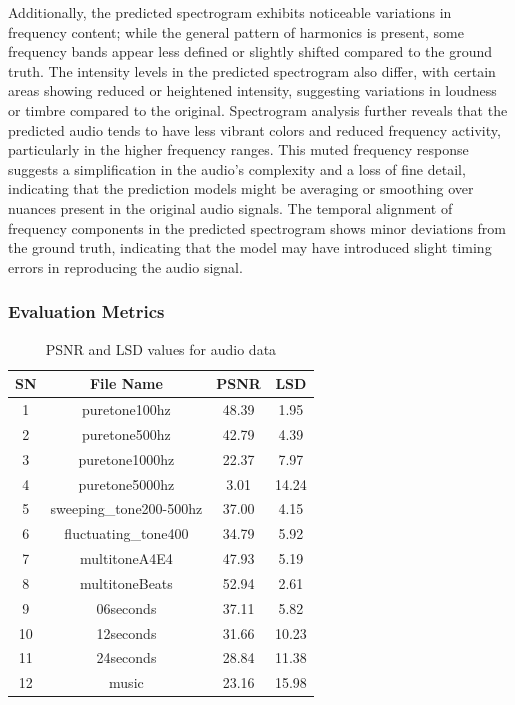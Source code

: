 \documentclass{ioereport}
\begin{document}
    Additionally, the predicted spectrogram exhibits noticeable variations in frequency content; while the general pattern of harmonics is present, some frequency bands appear less defined or slightly shifted compared to the ground truth. The intensity levels in the predicted spectrogram also differ, with certain areas showing reduced or heightened intensity, suggesting variations in loudness or timbre compared to the original. Spectrogram analysis further reveals that the predicted audio tends to have less vibrant colors and reduced frequency activity, particularly in the higher frequency ranges. This muted frequency response suggests a simplification in the audio's complexity and a loss of fine detail, indicating that the prediction models might be averaging or smoothing over nuances present in the original audio signals. The temporal alignment of frequency components in the predicted spectrogram shows minor deviations from the ground truth, indicating that the model may have introduced slight timing errors in reproducing the audio signal.
    \subsubsection{Evaluation Metrics}
    \begin{table}[H]
    \caption{PSNR and LSD values for audio data}
    \centering
    \begin{tabular}{|c|c|c|c|}
        \hline
        \textbf{SN} & \textbf{File Name} & \textbf{PSNR} & \textbf{LSD} \\
        \hline
        1  & puretone100hz & 48.39 & 1.95  \\
        \hline
        2  & puretone500hz & 42.79 & 4.39  \\
        \hline
        3  & puretone1000hz & 22.37 & 7.97  \\
        \hline
        4  & puretone5000hz & 3.01  & 14.24 \\
        \hline
        5  & sweeping\_tone200-500hz & 37.00 & 4.15  \\
        \hline
        6  & fluctuating\_tone400 & 34.79 & 5.92  \\
        \hline
        7  & multitoneA4E4 & 47.93 & 5.19  \\
        \hline
        8  & multitoneBeats & 52.94 & 2.61  \\
        \hline
        9  & 06seconds & 37.11 & 5.82  \\
        \hline
        10 & 12seconds & 31.66 & 10.23 \\
        \hline
        11 & 24seconds & 28.84 & 11.38 \\
        \hline
        12 & music & 23.16 & 15.98 \\
        \hline
    \end{tabular}
    \label{tab:audio_metrics_ordered}
\end{table}
\end{document}
